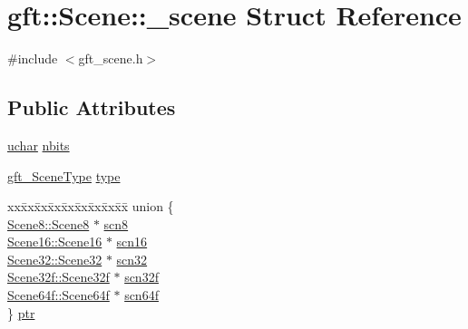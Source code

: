 \hypertarget{structgft_1_1Scene_1_1__scene}{\section{gft\-:\-:Scene\-:\-:\-\_\-scene Struct Reference}
\label{structgft_1_1Scene_1_1__scene}
}


{\ttfamily \#include $<$gft\-\_\-scene.\-h$>$}

\subsection*{Public Attributes}
\begin{DoxyCompactItemize}
\item 
\hyperlink{namespacegft_a6411e297d5ac5aa9b91a37da00952197}{uchar} \hyperlink{structgft_1_1Scene_1_1__scene_a8751823cdf9cb3e6425267985f6581b5}{nbits}
\item 
\hyperlink{gft__scene_8h_aff9f098ca5c194977bd33369499b22ed}{gft\-\_\-\-Scene\-Type} \hyperlink{structgft_1_1Scene_1_1__scene_a40b5c581b52b256d8a2fce38b3bfca99}{type}
\item 
\begin{tabbing}
xx\=xx\=xx\=xx\=xx\=xx\=xx\=xx\=xx\=\kill
union \{\\
\>\hyperlink{namespacegft_1_1Scene8_a78f9a172f8a505f9577adac7f85bc009}{Scene8::Scene8} $\ast$ \hyperlink{structgft_1_1Scene_1_1__scene_a8fe4664ea98a23e82a062375e72ec42e}{scn8}\\
\>\hyperlink{namespacegft_1_1Scene16_a5a4b9571f9e3e6e1393f03bc708bf5ae}{Scene16::Scene16} $\ast$ \hyperlink{structgft_1_1Scene_1_1__scene_af117843d6931f2303f5764b8384c3674}{scn16}\\
\>\hyperlink{namespacegft_1_1Scene32_ae492ac529c9149889605a7bebd647c46}{Scene32::Scene32} $\ast$ \hyperlink{structgft_1_1Scene_1_1__scene_aa2840b6d1c3fbb4aed6aff4d288d197a}{scn32}\\
\>\hyperlink{namespacegft_1_1Scene32f_af233a2e92a79c7b46da9b3f38677644a}{Scene32f::Scene32f} $\ast$ \hyperlink{structgft_1_1Scene_1_1__scene_a92e7c0a96c2dab89917ad81d0c39bf3a}{scn32f}\\
\>\hyperlink{namespacegft_1_1Scene64f_a512a42827b5e024a75792dd3e6fca5eb}{Scene64f::Scene64f} $\ast$ \hyperlink{structgft_1_1Scene_1_1__scene_a7a635c7c4abf82e0fe0740510c54b775}{scn64f}\\
\} \hyperlink{structgft_1_1Scene_1_1__scene_ad4d1cdf15700c3e3b5c935df677d1d2c}{ptr}\\

\end{tabbing}\end{DoxyCompactItemize}


